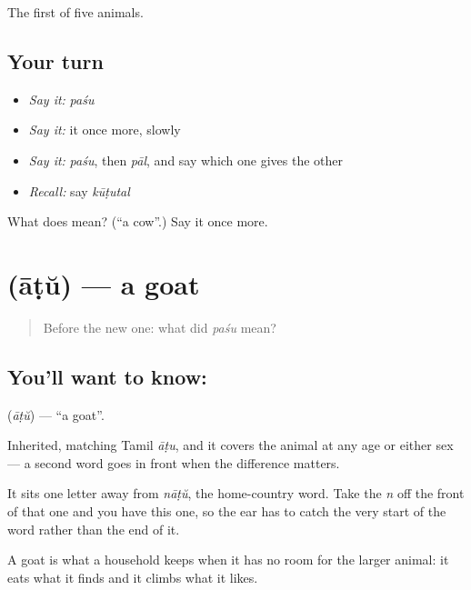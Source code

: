 \begin{grammarlens}[title={What you've built}]
The first of five animals.
\end{grammarlens}

\subsection*{Your turn}
\begin{itemize}
\raggedright
  \item \emph{Say it:} \emph{paśu}
  \item \emph{Say it:} it once more, slowly
  \item \emph{Say it:} \emph{paśu}, then \emph{pāl}, and say which one gives the other
  \item \emph{Recall:} say \emph{kūṭutal}
\end{itemize}

\begin{tcolorbox}[breakable,colback=teal!4,colframe=teal!35!black,title={Before you move on}]
What does  mean? (\textquotedblleft{}a cow\textquotedblright{}.) Say it once more.
\end{tcolorbox}
\section[\texorpdfstring{\ml{ആട്} (āṭŭ)}{ആട് (āṭŭ)}]{ (āṭŭ) — a goat}

\label{lesson:ML-C60-goat}



\begin{quote}
Before the new one: what did \emph{paśu} mean?
\end{quote}

\subsection*{You'll want to know: }
\textbf{} (\emph{āṭŭ}) — \textquotedblleft{}a goat\textquotedblright{}.

Inherited, matching Tamil \emph{āṭu}, and it covers the animal at any age or either sex — a second word goes in front when the difference matters.

It sits one letter away from \emph{nāṭŭ}, the home-country word. Take the \emph{n} off the front of that one and you have this one, so the ear has to catch the very start of the word rather than the end of it.

A goat is what a household keeps when it has no room for the larger animal: it eats what it finds and it climbs what it likes.

